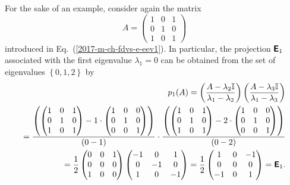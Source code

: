 {\color{blue}
\bexample
For the sake of an example, consider again the
{matrix}
\begin{equation}
A=
\begin{pmatrix}
1&0&1\\
0&1&0\\
1&0&1
\end{pmatrix}
\end{equation}
introduced in Eq.~(\ref{2017-m-ch-fdvs-e-eev1}).
In particular, the projection $\textsf{\textbf{E}}_1$ associated with the first eigenvalue $\lambda_1=0$
can be obtained from  the set of eigenvalues $\left\{  0,1,2 \right\}$ by
\begin{equation}
\begin{split}
p_1(A)=
\left( \frac{A-\lambda_2{\Bbb I}}{\lambda_1-\lambda_2} \right)
\left( \frac{A-\lambda_3{\Bbb I}}{\lambda_1-\lambda_3} \right) \\
=
\frac{
\left(
\begin{pmatrix}
1&0&1\\
0&1&0\\
1&0&1
\end{pmatrix}
-
1\cdot
\begin{pmatrix}
1&0&0\\
0&1&0\\
0&0&1
\end{pmatrix}
\right)}
{(0-1)}
\cdot
\frac{
\left(
\begin{pmatrix}
1&0&1\\
0&1&0\\
1&0&1
\end{pmatrix}
-
2\cdot
\begin{pmatrix}
1&0&0\\
0&1&0\\
0&0&1
\end{pmatrix}
\right)}
{(0-2)}
\\
=
\frac{1}{2}
\begin{pmatrix}
0&0&1\\
0&0&0\\
1&0&0
\end{pmatrix}
\begin{pmatrix}
-1&0&1\\
0&-1&0\\
1&0&-1
\end{pmatrix}
=
\frac{1}{2}
\begin{pmatrix}
1&0&-1\\
0&0&0\\
-1&0&1
\end{pmatrix}
=\textsf{\textbf{E}}_1.
\end{split}
\end{equation}

}
